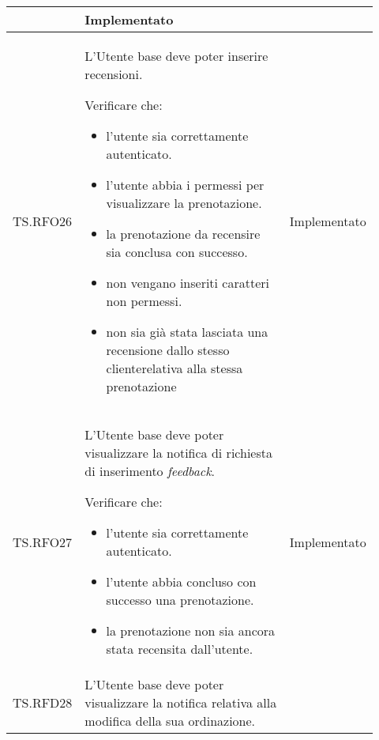 \begin{longtable}{|p{0.10\linewidth}|p{0.70\linewidth}|p{0.12\linewidth}|}
\begin{itemize}
	\end{itemize}                                                     &
	Implementato                                                                                                                                                            \\
	\hline
	TS.RFO26                                                                                                                        &
	L'Utente base deve poter inserire recensioni.   \par
	Verificare che:
	\begin{itemize}
		\item l'utente sia correttamente autenticato.
		\item l'utente abbia i permessi per visualizzare la prenotazione.
		\item la prenotazione da recensire sia conclusa con successo.
		\item non vengano inseriti caratteri non permessi.
		\item non sia già stata lasciata una recensione dallo stesso cliente\g relativa alla stessa prenotazione
	\end{itemize}                        &
	Implementato                                                                                                                                                            \\
	\hline
	TS.RFO27                                                                                                                        &
	L'Utente base deve poter visualizzare la notifica di richiesta di inserimento \textit{feedback}.\par
	Verificare che:
	\begin{itemize}
		\item l'utente sia correttamente autenticato.
		\item l'utente abbia concluso con successo una prenotazione.
		\item la prenotazione non sia ancora stata recensita dall'utente.
	\end{itemize}                                                               &
	Implementato                                                                                                                                                            \\
	\hline
	TS.RFD28                                                                                                                        &
	L'Utente base deve poter visualizzare la notifica relativa alla modifica della sua ordinazione.\par

\end{longtable}
